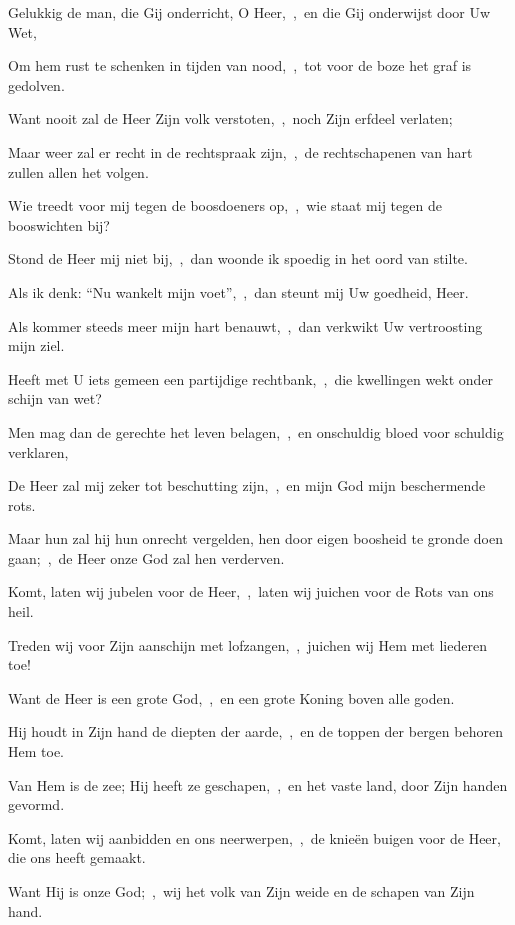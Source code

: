\documentclass[12pt,twoside,a5paper]{article}
\begin{document}
\begin{halfparskip}

  Gelukkig de man, die Gij onderricht, O Heer,~\sep\ en die Gij onderwijst door Uw Wet,

  Om hem rust te schenken in tijden van nood,~\sep\ tot voor de boze het graf is gedolven.

  Want nooit zal de Heer Zijn volk verstoten,~\sep\ noch Zijn erfdeel verlaten;

  Maar weer zal er recht in de rechtspraak zijn,~\sep\ de rechtschapenen van hart zullen allen het volgen.

  Wie treedt voor mij tegen de boosdoeners op,~\sep\ wie staat mij tegen de booswichten bij?

  Stond de Heer mij niet bij,~\sep\ dan woonde ik spoedig in het oord van stilte.

  Als ik denk: ``Nu wankelt mijn voet'',~\sep\ dan steunt mij Uw goedheid, Heer.

  Als kommer steeds meer mijn hart benauwt,~\sep\ dan verkwikt Uw vertroosting mijn ziel.

  Heeft met U iets gemeen een partijdige rechtbank,~\sep\ die kwellingen wekt onder schijn van wet?

  Men mag dan de gerechte het leven belagen,~\sep\ en onschuldig bloed voor schuldig verklaren,

  De Heer zal mij zeker tot beschutting zijn,~\sep\ en mijn God mijn beschermende rots.

  Maar hun zal hij hun onrecht vergelden, hen door eigen boosheid te gronde doen gaan;~\sep\ de Heer onze God zal hen verderven.
\end{halfparskip}


\begin{halfparskip}

  Komt, laten wij jubelen voor de Heer,~\sep\ laten wij juichen voor de Rots van ons heil.

  Treden wij voor Zijn aanschijn met lofzangen,~\sep\ juichen wij Hem met liederen toe!

  Want de Heer is een grote God,~\sep\ en een grote Koning boven alle goden.

  Hij houdt in Zijn hand de diepten der aarde,~\sep\ en de toppen der bergen behoren Hem toe.

  Van Hem is de zee; Hij heeft ze geschapen,~\sep\ en het vaste land, door Zijn handen gevormd.

  Komt, laten wij aanbidden en ons neerwerpen,~\sep\ de knieën buigen voor de Heer, die ons heeft gemaakt.

  Want Hij is onze God;~\sep\ wij het volk van Zijn weide en de schapen van Zijn hand.
\end{halfparskip}
\end{document}
